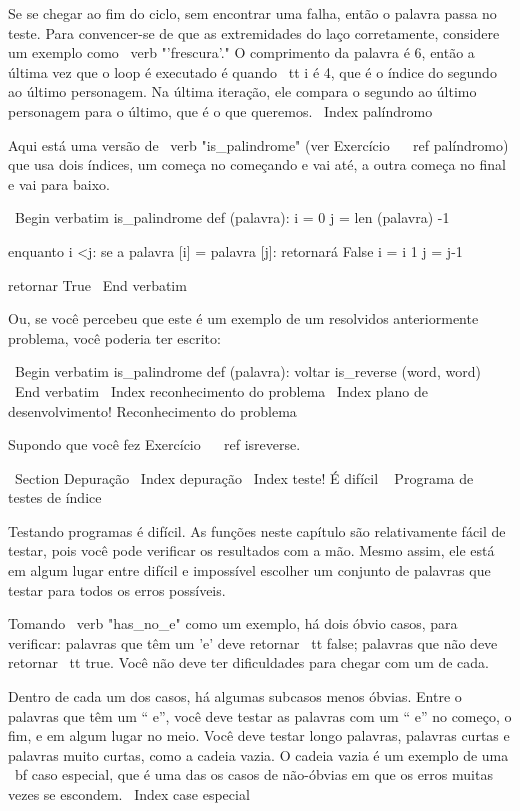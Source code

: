 \documentclass[10pt]{book}
\begin{document}
{{{{{{Se se chegar ao fim do ciclo, sem encontrar uma falha, então o
palavra passa no teste. Para convencer-se de que as extremidades do laço
corretamente, considere um exemplo como \ verb "'frescura'." O
comprimento da palavra é 6, então
a última vez que o loop é executado é quando {\ tt i} é 4, que é o
índice do segundo ao último personagem. Na última iteração,
ele compara o segundo ao último personagem para o último, que é
o que queremos.
\ Index {palíndromo}

Aqui está uma versão de \ verb "is_palindrome" (ver
Exercício ~ \ ref {palíndromo}) que usa dois índices, um começa no
começando e vai até, a outra começa no final e vai para baixo.

\ Begin {verbatim}
is_palindrome def (palavra):
    i = 0
    j = len (palavra) -1

    enquanto i <j:
        se a palavra [i] = palavra [j]:
            retornará False
        i = i 1
        j = j-1

    retornar True
\ End {verbatim}

Ou, se você percebeu que este é um exemplo de um resolvidos anteriormente
problema, você poderia ter escrito:

\ Begin {verbatim}
is_palindrome def (palavra):
    voltar is_reverse (word, word)
\ End {verbatim}
\ Index {reconhecimento do problema}
\ Index {plano de desenvolvimento! Reconhecimento do problema}

Supondo que você fez Exercício ~ \ ref {} isreverse.


\ Section {} Depuração
\ Index {depuração}
\ Index {teste! É difícil}
\ {} Programa de testes de índice

Testando programas é difícil. As funções neste capítulo são
relativamente fácil de testar, pois você pode verificar os resultados com a mão.
Mesmo assim, ele está em algum lugar entre difícil e impossível escolher um
conjunto de palavras que testar para todos os erros possíveis.

Tomando \ verb "has_no_e" como um exemplo, há dois óbvio
casos, para verificar: palavras que têm um 'e' deve retornar {\ tt false};
palavras que não deve retornar {\ tt true}. Você não deve ter
dificuldades para chegar com um de cada.

Dentro de cada um dos casos, há algumas subcasos menos óbvias. Entre o
palavras que têm um `` e'', você deve testar as palavras com um `` e'' no
começo, o fim, e em algum lugar no meio. Você deve testar longo
palavras, palavras curtas e palavras muito curtas, como a cadeia vazia. O
cadeia vazia é um exemplo de uma {\ bf caso especial}, que é uma das
os casos de não-óbvias em que os erros muitas vezes se escondem.
\ Index {case especial}

}}}}}}
\end{document}

